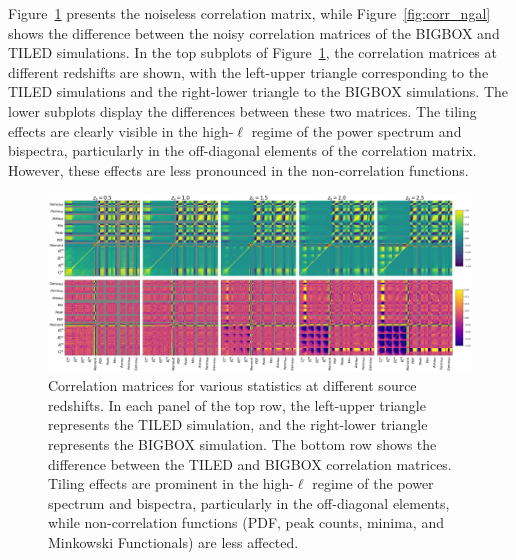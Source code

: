 Figure~\ref{fig:corr_noiseless} presents the noiseless correlation matrix, while Figure~\ref{fig:corr_ngal} shows the difference between the noisy correlation matrices of the BIGBOX and TILED simulations. 
In the top subplots of Figure~\ref{fig:corr_noiseless}, the correlation matrices at different redshifts are shown, with the left-upper triangle corresponding to the TILED simulations and the right-lower triangle to the BIGBOX simulations. The lower subplots display the differences between these two matrices. 
The tiling effects are clearly visible in the high-$\ell$ regime of the power spectrum and bispectra, particularly in the off-diagonal elements of the correlation matrix. However, these effects are less pronounced in the non-correlation functions.
\begin{figure}
    \centering
    \includegraphics[width=\textwidth]{figures/corr_noiseless_final.png}
    \caption{Correlation matrices for various statistics at different source redshifts. In each panel of the top row, the left-upper triangle represents the TILED simulation, and the right-lower triangle represents the BIGBOX simulation. The bottom row shows the difference between the TILED and BIGBOX correlation matrices. Tiling effects are prominent in the high-$\ell$ regime of the power spectrum and bispectra, particularly in the off-diagonal elements, while non-correlation functions (PDF, peak counts, minima, and Minkowski Functionals) are less affected.}
    \label{fig:corr_noiseless}
\end{figure}

